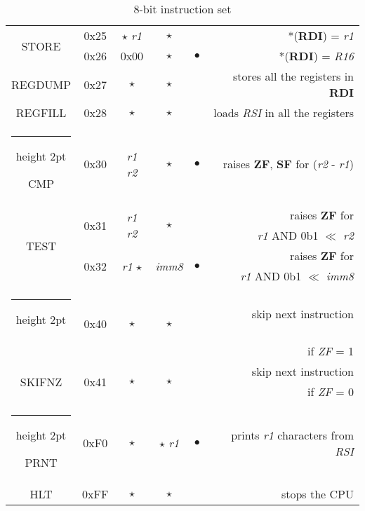 \documentclass[a4paper,12pt]{article}
\makeatletter
\newcommand{\thickhline}{%
    \noalign {\ifnum 0=`}\fi \hrule height 2pt
    \futurelet \reserved@a \@xhline
}
\makeatother
\begin{document}
\begin{table}[H]
\begin{tabular}{|c|c|c|c|c|r|}
        \hline
        \multirow{2}{*}{STORE} & 0x25 & $\star$ \quad \textit{r1} & $\star$ & & *(\textbf{RDI}) = \textit{r1}\\
        \cline{2-6}
                             & 0x26 & 0x00 & $\star$ & $\bullet$ & *(\textbf{RDI}) = \textit{R16}\\
        \hline
        REGDUMP & 0x27 & $\star$ & $\star$ & & stores all the registers in \textbf{RDI}\\
        \hline
        REGFILL & 0x28 & $\star$ & $\star$ & & loads \textit{RSI} in all the registers\\
        \thickhline
        CMP & 0x30 & \textit{r1} \quad \textit{r2} & $\star$ & $\bullet$ & raises \textbf{ZF}, \textbf{SF} for (\textit{r2} - \textit{r1})\\
        \hline
        \multirow{4}{*}{TEST} & \multirow{2}{*}{0x31} & \multirow{2}{*}{\textit{r1} \quad \textit{r2}} & \multirow{2}{*}{$\star$} & & raises \textbf{ZF} for \\
         & & & & & \textit{r1} AND 0b1 $\ll$ \textit{r2}\\
        \cline{2-6}
                             & \multirow{2}{*}{0x32} & \multirow{2}{*}{\textit{r1} \quad $\star$} & \multirow{2}{*}{\textit{imm8}} & \multirow{2}{*}{$\bullet$} & raises \textbf{ZF} for \\
                             & & & & & \textit{r1} AND 0b1 $\ll$ \textit{imm8}\\
        \thickhline
        \multirow{2}{*}{SKIFZ} & \multirow{2}{*}{0x40} & \multirow{2}{*}{$\star$} & \multirow{2}{*}{$\star$} & & skip next instruction\\
         & & & & & if \textit{ZF} = 1\\
        \cline{2-6}
        \multirow{2}{*}{SKIFNZ} & \multirow{2}{*}{0x41} & \multirow{2}{*}{$\star$} & \multirow{2}{*}{$\star$} & & skip next instruction\\
         & & & & & if \textit{ZF} = 0\\
        \cline{2-6}
        \thickhline

        PRNT & 0xF0 & $\star$ & $\star$ \quad \textit{r1} & $\bullet$ & prints \textit{r1} characters from \textit{RSI}\\
        \hline

        HLT & 0xFF & $\star$ & $\star$ & & stops the CPU\\
        \hline  
    \end{tabular}
    \caption{8-bit instruction set}
    \label{tab:8bit_instructions}
\end{table}
\end{document}
